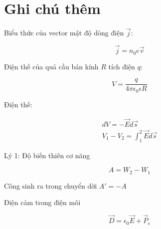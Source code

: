 \section{Ghi chú thêm}

Biểu thức của vector mật độ dòng điện $\vec{j}$:

\begin{equation*}
  \vec{j} = n_0e\vec{v}
\end{equation*}

Điện thế của quả cầu bán kính $R$ tích điện $q$:

\begin{equation*}
  V = \frac{q}{4\pi\epsilon_0\epsilon R}
\end{equation*}

Điện thế: 

\begin{gather*}
  dV = -\vec{E}d\vec{s} \\
  V_1 - V_2 = \int_{1}^{2} \vec{E}d\vec{s}
\end{gather*}

Lý 1: Độ biến thiên cơ năng 

\begin{equation*}
  A = W_2 - W_1
\end{equation*}

Công sinh ra trong chuyển dời $A' = -A$

Điện cảm trong điện môi

\begin{equation*}
  \vec{D} = \epsilon_0 \vec{E} + \vec{P}_e
\end{equation*}